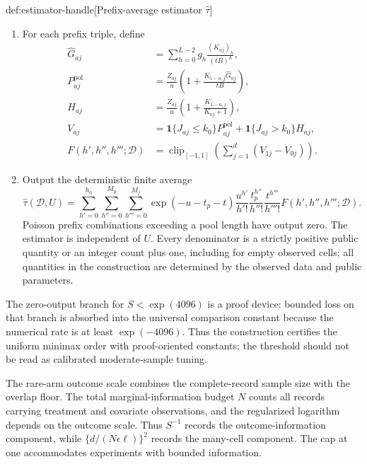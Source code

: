 \begin{algorithmv}{def:estimator-handle}[Prefix-average estimator $\widehat\tau$]
\begin{enumerate}
\item For each prefix triple, define
\[
\begin{aligned}
\widehat G_{aj}
&=\sum_{h=0}^{L-2}g_h\frac{(K_{aj})_h}{(tB)^h},\\
P_{aj}^{\mathrm{pol}}
&=\frac{Z_{aj}}u
\left(1+\frac{K_{1-a,j}\widehat G_{aj}}{tB}\right),\\
H_{aj}
&=\frac{Z_{aj}}u
\left(1+\frac{K_{1-a,j}}{K_{aj}+1}\right),\\
V_{aj}
&=\mathbf1\{J_{aj}\le k_0\}P_{aj}^{\mathrm{pol}}
+\mathbf1\{J_{aj}>k_0\}H_{aj},\\
F(h',h'',h''';\mathcal D)
&=\operatorname{clip}_{[-1,1]}
\left(\sum_{j=1}^d(V_{1j}-V_{0j})\right).
\end{aligned}
\]

\item Output the deterministic finite average
\[
\widehat\tau(\mathcal D,U)
=
\sum_{h'=0}^{h_0}\sum_{h''=0}^{M_p}\sum_{h'''=0}^{M_f}
\exp(-u-t_p-t)
\frac{u^{h'}}{h'!}
\frac{t_p^{h''}}{h''!}
\frac{t^{h'''}}{h'''!}
F(h',h'',h''';\mathcal D).
\]
Poisson prefix combinations exceeding a pool length have output zero. The estimator is independent of \(U\). Every denominator is a strictly positive public quantity or an integer count plus one, including for empty observed cells; all quantities in the construction are determined by the observed data and public parameters.
\end{enumerate}
\end{algorithmv}

The zero-output branch for \(S<\exp(4096)\) is a proof device: bounded loss on that branch is absorbed into the universal comparison constant because the numerical rate is at least \(\exp(-4096)\). Thus the construction certifies the uniform minimax order with proof-oriented constants; the threshold should not be read as calibrated moderate-sample tuning.





The rare-arm outcome scale  combines the complete-record sample size with the overlap floor. The total marginal-information budget \(N\) counts all records carrying treatment and covariate observations, and the regularized logarithm  depends on the outcome scale. Thus \(S^{-1}\) records the outcome-information component, while \(\{d/(N\epsilon\ell)\}^2\) records the many-cell component. The cap at one accommodates experiments with bounded information.

